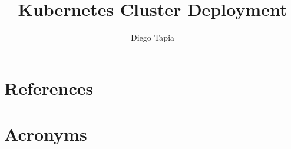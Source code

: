 \documentclass[PMO,lsstdraft,authoryear,toc,]{lsstdoc}
\title{Kubernetes Cluster Deployment}
\author{%
Diego Tapia
}
\date{\vcsDate}
\begin{document}
\maketitle




\appendix
\section{References} \label{sec:bib}
\renewcommand{\refname}{} %


\section{Acronyms} \label{sec:acronyms}

\end{document}
